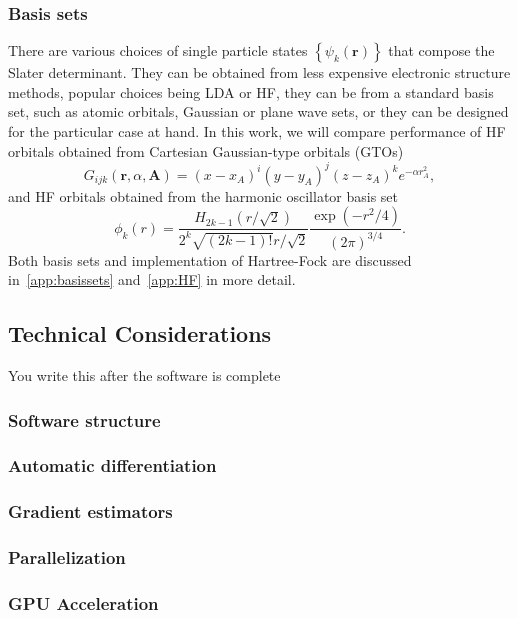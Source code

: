 \documentclass[final,3p,times,twocolumn]{elsarticle}
\begin{document}
	\subsubsection{Basis sets}
	There are various choices of single particle states $\left\{\psi_k(\mathbf{r})\right\}$ that compose the Slater determinant. They can be obtained from less expensive electronic structure methods, popular choices being LDA or HF, they can be from a standard basis set, such as atomic orbitals, Gaussian or plane wave sets, or they can be designed for the particular case at hand. In this work, we will compare performance of HF orbitals obtained from Cartesian Gaussian-type orbitals (GTOs)
	\begin{equation}
	G_{i j k}(\mathbf{r}, \alpha, \mathbf{A})=(x-x_{A})^{i} (y-y_{A})^{j} (z-z_{A})^{k} e^{-\alpha r_{A}^{2}},
	\end{equation}
	and HF orbitals obtained from the harmonic oscillator basis set
	\begin{equation}
		\phi_{k}(r)=\frac{H_{2 k-1}(r / \sqrt{2})}{2^{k} \sqrt{(2 k-1) !} r / \sqrt{2}} \frac{\exp \left(-r^{2} / 4\right)}{(2 \pi)^{3 / 4}}.
	\end{equation}
	Both basis sets and implementation of Hartree-Fock are discussed in~\ref{app:basissets} and~\ref{app:HF} in more detail.  
	
	\subsection{Technical Considerations}
	You write this after the software is complete
	
	\subsubsection{Software structure}
	\subsubsection{Automatic differentiation}
	\subsubsection{Gradient estimators}
	\subsubsection{Parallelization}
	\subsubsection{GPU Acceleration}
	
\end{document}
